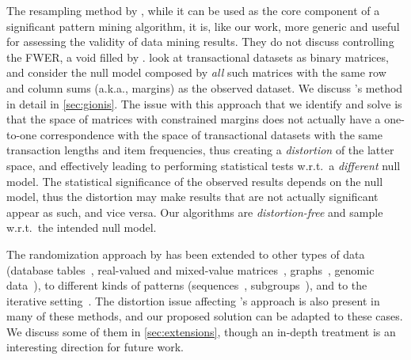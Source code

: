 The resampling method by \citet{GionisMMT07}, while it can be used as the  core
component of a significant pattern mining algorithm, it is, like our work, more
generic and useful for assessing the validity of data mining results. They
do not discuss controlling the FWER, a void filled by \citet{Hanhijarvi11}.
\citet{GionisMMT07} look at transactional datasets as binary matrices, and
consider the null model composed by \emph{all} such matrices with the same row
and column sums (a.k.a., margins) as the observed dataset. We discuss
\citet{GionisMMT07}'s method in detail in \cref{sec:gionis}. The issue with this
approach that we identify and solve is that the space of matrices with
constrained margins does not actually have a one-to-one correspondence with the
space of transactional datasets with the same transaction lengths and item
frequencies, thus creating a \emph{distortion} of the latter space, and
effectively leading to performing statistical tests w.r.t.\ a \emph{different}
null model. The statistical significance of the observed results depends on the
null model, thus the distortion may make results that are not actually
significant appear as such, and vice versa. Our algorithms are
\emph{distortion-free} and sample w.r.t.\ the intended null model.

The randomization approach by \citet{GionisMMT07} has been extended to other
types of data (database tables~\citep{OjalaGGM10}, real-valued and mixed-value
matrices~\citep{OjalaVKHM08,Ojala10},
graphs~\citep{HanhijarviGP09,GunnemannDJE12}, genomic
data~\citep{FerkingstadHS15}), to different kinds of patterns
(sequences~\citep{TononV19}, subgroups~\citep{DuivesteijnK11}), and to the
iterative setting~\citep{HanhijarviOVPTM09}.  The  distortion issue affecting
\citet{GionisMMT07}'s approach is also present in many of these methods, and our
proposed solution can be adapted to these cases. We discuss some of them in
\cref{sec:extensions}, though an in-depth treatment is an interesting direction
for future work.
